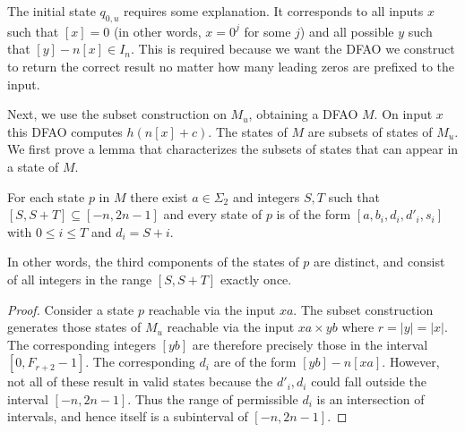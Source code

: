 \documentclass[12pt,reqno]{article}
\begin{document}
The initial state $q_{0,u}$ requires some
explanation.   It corresponds to all inputs $x$ such that
$[x]=0$ (in other words, $x = 0^j$ for some $j$) and all possible $y$ such that $[y]-n[x] \in I_n$.   This is required because
we want the DFAO we construct to return the correct result no matter how many leading zeros are prefixed to the input.

Next, we use the subset construction on $M_u$, obtaining a DFAO $M$.
On input $x$ this DFAO computes $h(n[x] + c)$.  
The states of $M$ are subsets of states of $M_u$.  We first prove a
lemma that characterizes the subsets of states that can appear in
a state of $M$.



\begin{lemma}
For each state $p$ in $M$
there exist $a \in \Sigma_2$ and integers $S, T$ such 
that $[S, S+T] \subseteq [-n,2n-1]$ and every state of $p$ is of the form
$[a, b_i, d_i, d'_i, s_i]$ 
with $0 \leq i \leq T$ and $d_i = S+i$.
\label{lemma:lin-subseq-consec}
\end{lemma}
In other words, the third components of the states of $p$ are distinct,
and consist of all integers in the range $[S, S+T]$ exactly once.
\begin{proof}
Consider a state $p$ reachable via the input $xa$.   The subset construction
generates those states of $M_u$ reachable via the input $xa \times yb$ where
$r = |y| = |x|$.  The corresponding integers $[yb]$ are therefore precisely those in the interval $[0,F_{r+2}-1]$.  The corresponding $d_i$ are of the form $[yb]-n[xa]$.  However, not all of these result in valid states
because the $d'_i, d_i$ could fall outside the interval $[-n, 2n-1]$.
Thus the range of permissible $d_i$ is an intersection of intervals, and hence
itself is a subinterval of $[-n,2n-1]$.
\end{proof}
\end{document}
